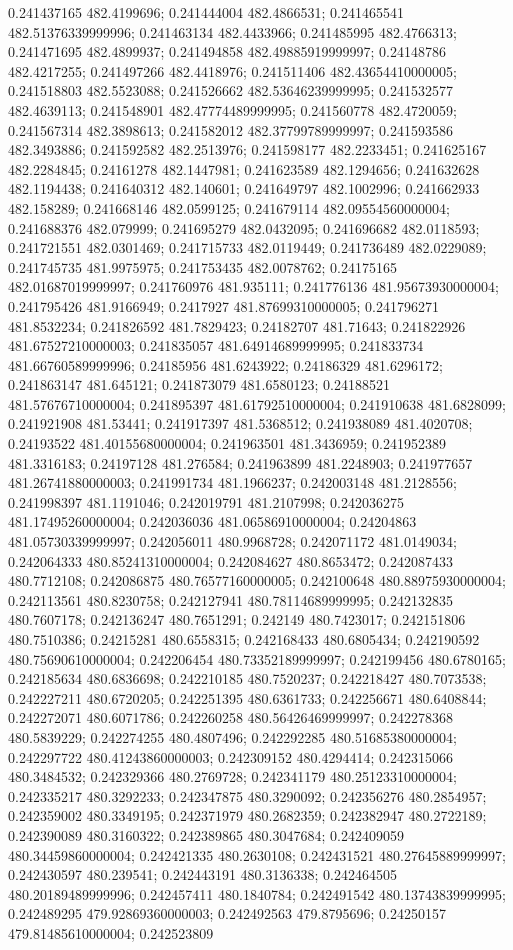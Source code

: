 0.241437165 482.4199696; 0.241444004 482.4866531; 0.241465541 482.51376339999996; 0.241463134 482.4433966; 0.241485995 482.4766313; 0.241471695 482.4899937; 0.241494858 482.49885919999997; 0.24148786 482.4217255; 0.241497266 482.4418976; 0.241511406 482.43654410000005; 0.241518803 482.5523088; 0.241526662 482.53646239999995; 0.241532577 482.4639113; 0.241548901 482.47774489999995; 0.241560778 482.4720059; 0.241567314 482.3898613; 0.241582012 482.37799789999997; 0.241593586 482.3493886; 0.241592582 482.2513976; 0.241598177 482.2233451; 0.241625167 482.2284845; 0.24161278 482.1447981; 0.241623589 482.1294656; 0.241632628 482.1194438; 0.241640312 482.140601; 0.241649797 482.1002996; 0.241662933 482.158289; 0.241668146 482.0599125; 0.241679114 482.09554560000004; 0.241688376 482.079999; 0.241695279 482.0432095; 0.241696682 482.0118593; 0.241721551 482.0301469; 0.241715733 482.0119449; 0.241736489 482.0229089; 0.241745735 481.9975975; 0.241753435 482.0078762; 0.24175165 482.01687019999997; 0.241760976 481.935111; 0.241776136 481.95673930000004; 0.241795426 481.9166949; 0.2417927 481.87699310000005; 0.241796271 481.8532234; 0.241826592 481.7829423; 0.24182707 481.71643; 0.241822926 481.67527210000003; 0.241835057 481.64914689999995; 0.241833734 481.66760589999996; 0.24185956 481.6243922; 0.24186329 481.6296172; 0.241863147 481.645121; 0.241873079 481.6580123; 0.24188521 481.57676710000004; 0.241895397 481.61792510000004; 0.241910638 481.6828099; 0.241921908 481.53441; 0.241917397 481.5368512; 0.241938089 481.4020708; 0.24193522 481.40155680000004; 0.241963501 481.3436959; 0.241952389 481.3316183; 0.24197128 481.276584; 0.241963899 481.2248903; 0.241977657 481.26741880000003; 0.241991734 481.1966237; 0.242003148 481.2128556; 0.241998397 481.1191046; 0.242019791 481.2107998; 0.242036275 481.17495260000004; 0.242036036 481.06586910000004; 0.24204863 481.05730339999997; 0.242056011 480.9968728; 0.242071172 481.0149034; 0.242064333 480.85241310000004; 0.242084627 480.8653472; 0.242087433 480.7712108; 0.242086875 480.76577160000005; 0.242100648 480.88975930000004; 0.242113561 480.8230758; 0.242127941 480.78114689999995; 0.242132835 480.7607178; 0.242136247 480.7651291; 0.242149 480.7423017; 0.242151806 480.7510386; 0.24215281 480.6558315; 0.242168433 480.6805434; 0.242190592 480.75690610000004; 0.242206454 480.73352189999997; 0.242199456 480.6780165; 0.242185634 480.6836698; 0.242210185 480.7520237; 0.242218427 480.7073538; 0.242227211 480.6720205; 0.242251395 480.6361733; 0.242256671 480.6408844; 0.242272071 480.6071786; 0.242260258 480.56426469999997; 0.242278368 480.5839229; 0.242274255 480.4807496; 0.242292285 480.51685380000004; 0.242297722 480.41243860000003; 0.242309152 480.4294414; 0.242315066 480.3484532; 0.242329366 480.2769728; 0.242341179 480.25123310000004; 0.242335217 480.3292233; 0.242347875 480.3290092; 0.242356276 480.2854957; 0.242359002 480.3349195; 0.242371979 480.2682359; 0.242382947 480.2722189; 0.242390089 480.3160322; 0.242389865 480.3047684; 0.242409059 480.34459860000004; 0.242421335 480.2630108; 0.242431521 480.27645889999997; 0.242430597 480.239541; 0.242443191 480.3136338; 0.242464505 480.20189489999996; 0.242457411 480.1840784; 0.242491542 480.13743839999995; 0.242489295 479.92869360000003; 0.242492563 479.8795696; 0.24250157 479.81485610000004; 0.242523809 